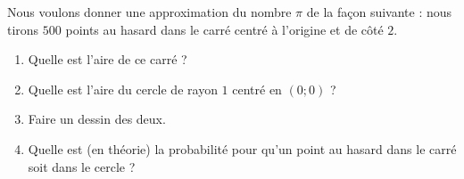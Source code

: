
\begin{exercice}\label{exosmath-0582}

    Nous voulons donner une approximation du nombre \( \pi\) de la façon suivante : nous tirons \( 500\) points au hasard dans le carré centré à l'origine et de côté \( 2\).
    \begin{enumerate}
        \item
            Quelle est l'aire de ce carré ?
        \item
            Quelle est l'aire du cercle de rayon \( 1\) centré en \( (0;0)\) ?
        \item
            Faire un dessin des deux.
        \item
            Quelle est (en théorie) la probabilité pour qu'un point au hasard dans le carré soit dans le cercle ?
    \end{enumerate}

\end{exercice}
